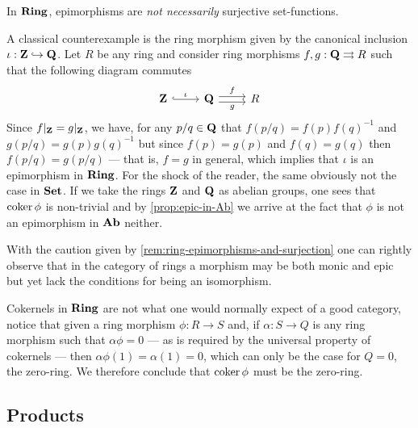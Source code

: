 %
\begin{remark}
\label{rem:ring-epimorphisms-and-surjection}
In \({\textbf{Ring}}\), epimorphisms are \emph{not necessarily} surjective set-functions.

A classical counterexample is the ring morphism given by the canonical inclusion
\(\iota: \mathbf{Z} \hookrightarrow \mathbf{Q}\). Let \(R\) be any ring and consider ring morphisms
\(f, g: \mathbf{Q} \rightrightarrows R\) such that the following diagram commutes
\[
\begin{tikzcd}
\Z \ar[r, hook, "\iota"]
&\Q \ar[r, shift left, "f"] \ar[r, shift right, swap, "g"]
&R
\end{tikzcd}
\]
Since \(f|_{\mathbf{Z}} = g|_{\mathbf{Z}}\), we have, for any \(p/q \in \mathbf{Q}\) that
\(f(p/q) = f(p) f(q)^{-1}\) and \(g(p/q) = g(p) g(q)^{-1}\) but since
\(f(p) = g(p)\) and \(f(q) = g(q)\) then \(f(p/q) = g(p/q)\) --- that is,
\(f = g\) in general, which implies that \(\iota\) is an epimorphism in
\({\textbf{Ring}}\). For the shock of the reader, the same obviously not the case in
\({\textbf{Set}}\). If we take the rings \(\mathbf{Z}\) and \(\mathbf{Q}\) as abelian groups, one sees
that \(\operatorname{coker} \phi\) is non-trivial and by \cref{prop:epic-in-Ab} we arrive at
the fact that \(\phi\) is not an epimorphism in \({\textbf{Ab}}\) neither.
\end{remark}
%

%
\begin{remark}
\label{rem:isomorphisms-in-ring}
With the caution given by \cref{rem:ring-epimorphisms-and-surjection} one can
rightly observe that in the category of rings a morphism may be both monic and
epic but yet lack the conditions for being an isomorphism.
\end{remark}
%

\begin{remark}
\label{rem:cokernel-in-ring}
Cokernels in \({\textbf{Ring}}\) are not what one would normally expect of a good category,
notice that given a ring morphism \(\phi: R \to S\) and, if \(\alpha: S \to Q\)
is any ring morphism such that \(\alpha \phi = 0\) --- as is required by the
universal property of cokernels --- then \(\alpha\phi(1) = \alpha(1) = 0\),
which can only be the case for \(Q = 0\), the zero-ring. We therefore conclude
that \(\operatorname{coker} \phi\) must be the zero-ring.
\end{remark}

\subsection{Products}

